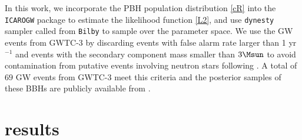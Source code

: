 \documentclass[twocolumn]{aastex631}
\begin{document}
In this work, we incorporate the PBH population distribution \eqref{cR} into the \texttt{ICAROGW} \citep{Mastrogiovanni:2021wsd} package to estimate the likelihood function \eqref{L2}, and use \texttt{dynesty} \citep{Speagle:2019ivv} sampler called from \texttt{Bilby} \citep{Ashton:2018jfp,Romero-Shaw:2020owr} to sample over the parameter space. We use the GW events from GWTC-3 by discarding events with false alarm rate larger than 1 yr$^{-1}$ and events with the secondary component mass smaller than $3\Msun$ to avoid contamination from putative events involving neutron stars following \cite{DeLuca:2021wjr}. A total of $69$ GW events from GWTC-3 meet this criteria and the posterior samples of these BBHs are publicly available from \cite{ligo_scientific_collaboration_and_virgo_2021_5655785}.

\section{\label{result}results}
\end{document}
